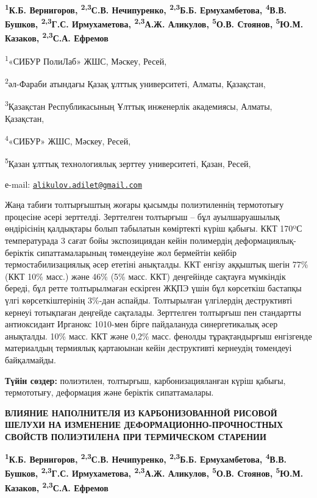 {\bfseries \textsuperscript{1}К.Б. Вернигоров, \textsuperscript{2,3}С.В.
Нечипуренко, \textsuperscript{2,3}Б.Б. Ермухамбетова,
\textsuperscript{4}В.В. Бушков, \textsuperscript{2,3}Г.С. Ирмухаметова,
\textsuperscript{2,3}А.Ж. Аликулов\textsuperscript{\envelope },
\textsuperscript{5}О.В. Стоянов, \textsuperscript{5}Ю.М. Казаков,
\textsuperscript{2,3}С.А. Ефремов}

\textsuperscript{1}«СИБУР ПолиЛаб» ЖШС, Мәскеу, Ресей,

\textsuperscript{2}әл-Фараби атындағы Қазақ ұлттық университеті, Алматы,
Қазақстан,

\textsuperscript{3}Қазақстан Республикасының Ұлттық инженерлік
академиясы, Алматы, Қазақстан,

\textsuperscript{4}«СИБУР» ЖШС, Мәскеу, Ресей,

\textsuperscript{5}Қазан ұлттық технологиялық зерттеу университеті,
Қазан, Ресей,

е-mail:
\href{mailto:alikulov.adilet@gmail.com}{\nolinkurl{alikulov.adilet@gmail.com}}

Жаңа табиғи толтырғыштың жоғары қысымды полиэтиленнің термототығу
процесіне әсері зерттелді. Зерттелген толтырғыш -- бұл ауылшаруашылық
өндірісінің қалдықтары болып табылатын көміртекті күріш қабығы. ККТ
170ºС температурада 3 сағат бойы экспозициядан кейін полимердің
деформациялық-беріктік сипаттамаларының төмендеуіне жол бермейтін кейбір
термостабилизациялық әсер ететіні анықталды. ККТ енгізу аққыштық шегін
77\% (ККТ 10\% масс.) және 46\% (5\% масс. ККТ) деңгейінде сақтауға
мүмкіндік береді, бұл ретте толтырылмаған ескірген ЖҚПЭ үшін бұл
көрсеткіш бастапқы үлгі көрсеткіштерінің 3\%-дан аспайды. Толтырылған
үлгілердің деструктивті кернеуі тотықпаған деңгейде сақталады.
Зерттелген толтырғыш пен стандартты антиоксидант Ирганокс 1010-мен бірге
пайдалануда синергетикалық әсер анықталды. 10\% масс. ККТ және 0,2\%
масс. фенолды тұрақтандырғыш енгізгенде материалдың термиялық қартаюынан
кейін деструктивті кернеудің төмендеуі байқалмайды.

{\bfseries Түйін сөздер:} полиэтилен, толтырғыш, карбонизацияланған күріш
қабығы, термототығу, деформация және беріктік сипаттамалары.

{\bfseries ВЛИЯНИЕ НАПОЛНИТЕЛЯ ИЗ КАРБОНИЗОВАННОЙ РИСОВОЙ ШЕЛУХИ НА
ИЗМЕНЕНИЕ ДЕФОРМАЦИОННО-ПРОЧНОСТНЫХ СВОЙСТВ ПОЛИЭТИЛЕНА ПРИ ТЕРМИЧЕСКОМ
СТАРЕНИИ}

{\bfseries \textsuperscript{1}К.Б. Вернигоров, \textsuperscript{2,3}С.В.
Нечипуренко, \textsuperscript{2,3}Б.Б. Ермухамбетова,
\textsuperscript{4}В.В. Бушков, \textsuperscript{2,3}Г.С. Ирмухаметова,
\textsuperscript{2,3}А.Ж. Аликулов\textsuperscript{\envelope },
\textsuperscript{5}О.В. Стоянов, \textsuperscript{5}Ю.М. Казаков,
\textsuperscript{2,3}С.А. Ефремов}

